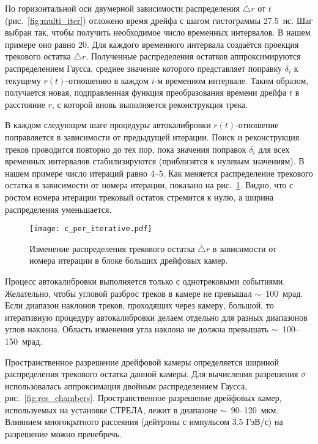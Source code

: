 По горизонтальной оси двумерной зависимости распределения $\triangle r$ от $t$
(рис.~\ref{fig:multi_iter}) отложено время дрейфа с шагом гистограммы 27.5~нс.
Шаг выбран так, чтобы получить необходимое число временных интервалов. В нашем
примере оно равно 20. Для каждого временного интервала создаётся проекция
трекового остатка $\triangle r$. Полученные распределения остатков
аппроксимируются распределением Гаусса, среднее значение которого представляет
поправку $\delta_i$ к текущему $r(t)$-отношению в каждом $i$-м временном
интервале. Таким образом, получается новая, подправленная функция преобразования
времени дрейфа $t$ в расстояние $r$, с которой вновь выполняется реконструкция
трека.

В каждом следующем шаге процедуры автокалибровки $r(t)$-отно\-шение поправляется
в зависимости от предыдущей итерации. Поиск и реконструкция треков проводится
повторно до тех пор, пока значения поправок $\delta_i$ для всех временных
интервалов стабилизируются (приблизятся к нулевым значениям). В нашем примере
число итераций равно 4--5. Как меняется распределение трекового остатка в
зависимости от номера итерации, показано на рис.~\ref{fig:per_iterative}.
Видно, что с ростом номера итерации трековый остаток стремится к нулю, а ширина
распределения уменьшается.

\begin{figure}[h]
  \centering
  \texttt{[image: c\_per\_iterative.pdf]}
  \caption{Изменение распределения трекового остатка $\triangle r$ в зависимости
    от номера итерации в блоке больших дрейфовых камер.}
  \label{fig:per_iterative}
\end{figure}

Процесс автокалибровки выполняется только с однотрековыми событиями. Желательно,
чтобы угловой разброс треков в камере не превышал $\sim$~100~мрад. Если диапазон
наклонов треков, проходящих через камеру, большой, то итеративную процедуру
автокалибровки делаем отдельно для разных диапазонов углов наклона. Область
изменения угла наклона не должна превышать $\sim$~100--150~мрад.

Пространственное разрешение дрейфовой камеры определяется шириной распределения
трекового остатка данной камеры. Для вычисления разрешения $\sigma$
использовалась аппроксимация двойным распределением Гаусса,
рис.~\ref{fig:res_chambers}. Пространственное разрешение дрейфовых камер,
используемых на установке СТРЕЛА, лежит в диапазоне $\sim$~90--120~мкм.
Влиянием многократного рассеяния (дейтроны с импульсом 3.5 ГэВ/с) на разрешение
можно пренебречь.

